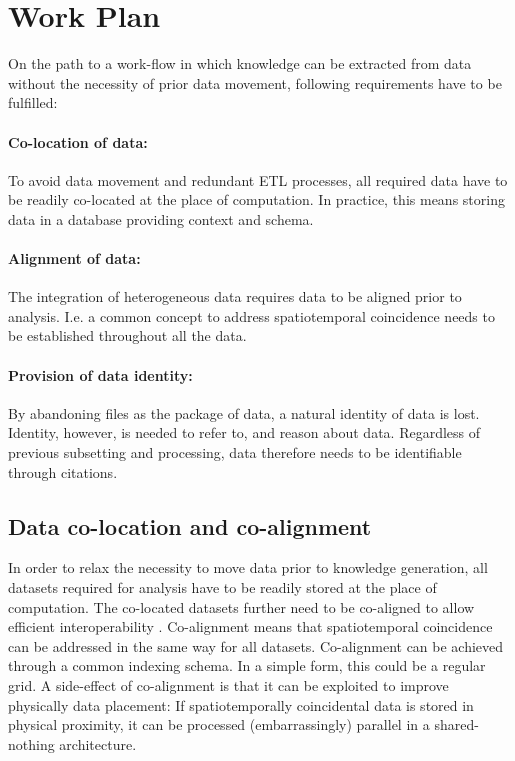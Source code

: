 \documentclass[a4paper,10pt]{article}
\begin{document}
\newpage

\section{Work Plan}
On the path to a work-flow in which knowledge can be extracted from data without the necessity of prior data movement, following requirements have to be fulfilled:

\paragraph{Co-location of data:}
To avoid data movement and redundant \gls{ETL} processes, all required data have to be readily co-located at the place of computation. In practice, this means storing data in a database providing context and schema.

\paragraph{Alignment of data:}
The integration of heterogeneous data requires data to be aligned prior to analysis. I.e. a common concept to address spatiotemporal coincidence needs to be established throughout all the data.

\paragraph{Provision of data identity:}
By abandoning files as the package of data, a natural identity of data is lost. Identity, however, is needed to refer to, and reason about data. Regardless of previous subsetting and processing, data therefore needs to be identifiable through citations.

\subsection{Data co-location and co-alignment}
In order to relax the necessity to move data prior to knowledge generation, all datasets required for analysis have to be readily stored at the place of computation. 
The co-located datasets further need to be co-aligned to allow efficient interoperability \citep{Kuo2017, Rilee2016}. 
Co-alignment means that spatiotemporal coincidence can be addressed in the same way for all datasets. 
Co-alignment can be achieved through a common indexing schema. 
In a simple form, this could be a regular grid. 
A side-effect of co-alignment is that it can be exploited to improve physically data placement: If spatiotemporally coincidental data is stored in physical proximity, it can be processed (embarrassingly) parallel in a shared-nothing architecture\citep{Kuo2017}.
\end{document}
